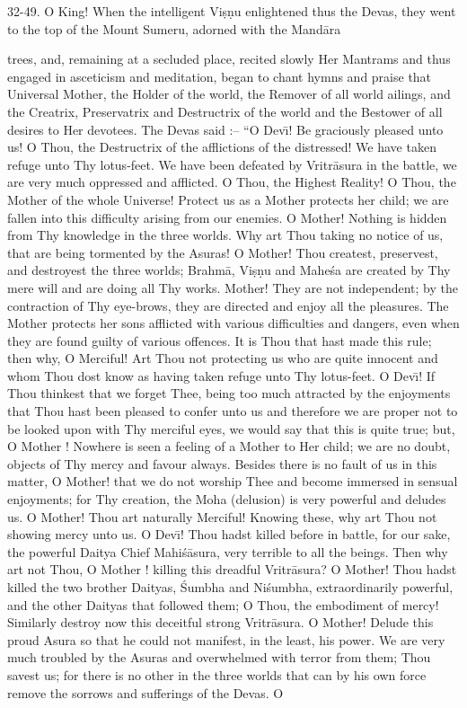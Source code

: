 32-49. O King! When the intelligent Vi\d{s}\d{n}u enlightened thus the Devas, they went to the top of the Mount Sumeru, adorned with the Mand\=ara

trees, and, remaining at a secluded place, recited slowly Her Mantrams and thus engaged in asceticism and meditation, began to chant hymns and praise that Universal Mother, the Holder of the world, the Remover of all world ailings, and the Creatrix, Preservatrix and Destructrix of the world and the Bestower of all desires to Her devotees. The Devas said :-- ``O Dev\={\i}! Be graciously pleased unto us! O Thou, the Destructrix of the afflictions of the distressed! We have taken refuge unto Thy lotus-feet. We have been defeated by Vritr\=asura in the battle, we are very much oppressed and afflicted. O Thou, the Highest Reality! O Thou, the Mother of the whole Universe! Protect us as a Mother protects her child; we are fallen into this difficulty arising from our enemies. O Mother! Nothing is hidden from Thy knowledge in the three worlds. Why art Thou taking no notice of us, that are being tormented by the Asuras! O Mother! Thou createst, preservest, and destroyest the three worlds; Brahm\=a, Vi\d{s}\d{n}u and Mahe\'sa are created by Thy mere will and are doing all Thy works. Mother! They are not independent; by the contraction of Thy eye-brows, they are directed and enjoy all the pleasures. The Mother protects her sons afflicted with various difficulties and dangers, even when they are found guilty of various offences. It is Thou that hast made this rule; then why, O Merciful! Art Thou not protecting us who are quite innocent and whom Thou dost know as having taken refuge unto Thy lotus-feet. O Dev\={\i}! If Thou thinkest that we forget Thee, being too much attracted by the enjoyments that Thou hast been pleased to confer unto us and therefore we are proper not to be looked upon with Thy merciful eyes, we would say that this is quite true; but, O Mother ! Nowhere is seen a feeling of a Mother to Her child; we are no doubt, objects of Thy mercy and favour always. Besides there is no fault of us in this matter, O Mother! that we do not worship Thee and become immersed in sensual enjoyments; for Thy creation, the Moha (delusion) is very powerful and deludes us. O Mother! Thou art naturally Merciful! Knowing these, why art Thou not showing mercy unto us. O Dev\={\i}! Thou hadst killed before in battle, for our sake, the powerful Daitya Chief Mahi\'s\=asura, very terrible to all the beings. Then why art not Thou, O Mother ! killing this dreadful Vritr\=asura? O Mother! Thou hadst killed the two brother Daityas, \'Sumbha and Ni\'sumbha, extraordinarily powerful, and the other Daityas that followed them; O Thou, the embodiment of mercy! Similarly destroy now this deceitful strong Vritr\=asura. O Mother! Delude this proud Asura so that he could not manifest, in the least, his power. We are very much troubled by the Asuras and overwhelmed with terror from them; Thou savest us; for there is no other in the three worlds that can by his own force remove the sorrows and sufferings of the Devas. O

